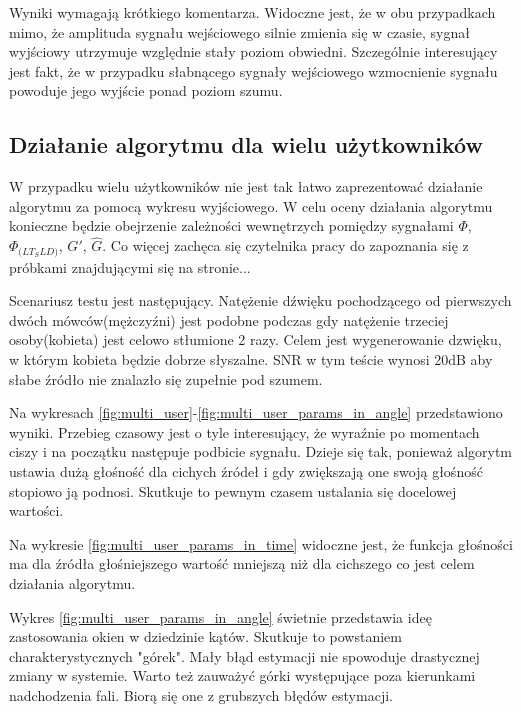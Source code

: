 \noindent Wyniki wymagają krótkiego komentarza. Widoczne jest, że w obu przypadkach mimo, że amplituda sygnału wejściowego silnie zmienia się w czasie, sygnał wyjściowy utrzymuje względnie stały poziom obwiedni. Szczególnie interesujący jest fakt, że w przypadku słabnącego sygnały wejściowego wzmocnienie sygnału powoduje jego wyjście ponad poziom szumu.

\subsection{Działanie algorytmu dla wielu użytkowników}

W przypadku wielu użytkowników nie jest tak łatwo zaprezentować działanie algorytmu za pomocą wykresu wyjściowego. W celu oceny działania algorytmu konieczne będzie obejrzenie zależności wewnętrzych pomiędzy sygnałami $\Phi$, $\Phi_{\mathrm(LT_SLD)}$, $G'$, $\widehat{G}$. Co więcej zachęca się czytelnika pracy do zapoznania się z próbkami znajdującymi się na stronie...

\noindent Scenariusz testu jest następujący. Natężenie dźwięku pochodzącego od pierwszych dwóch mówców(mężczyźni) jest podobne podczas gdy natężenie trzeciej osoby(kobieta) jest celowo stłumione 2 razy. Celem jest wygenerowanie dzwięku, w którym kobieta będzie dobrze słyszalne. SNR w tym teście wynosi 20dB aby słabe źródło nie znalazło się zupełnie pod szumem.

\noindent Na wykresach \ref{fig:multi_user}-\ref{fig:multi_user_params_in_angle} przedstawiono wyniki. Przebieg czasowy jest o tyle interesujący, że wyraźnie po momentach ciszy i na początku następuje podbicie sygnału. Dzieje się tak, ponieważ algorytm ustawia dużą głośność dla cichych źródeł i gdy zwiększają one swoją głośność stopiowo ją podnosi. Skutkuje to pewnym czasem ustalania się docelowej wartości.

\noindent Na wykresie \ref{fig:multi_user_params_in_time} widoczne jest, że funkcja głośności ma dla źródła głośniejszego wartość mniejszą niż dla cichszego co jest celem działania algorytmu.

\noindent Wykres \ref{fig:multi_user_params_in_angle} świetnie przedstawia ideę zastosowania okien w dziedzinie kątów. Skutkuje to powstaniem charakterystycznych "górek". Mały błąd estymacji nie spowoduje drastycznej zmiany w systemie. Warto też zauważyć górki występujące poza kierunkami nadchodzenia fali. Biorą się one z grubszych błędów estymacji.

